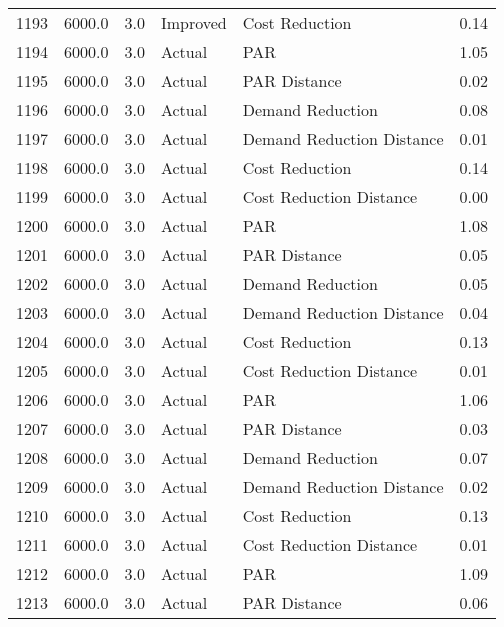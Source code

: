 \begin{longtable}{lrrllr}
1193 &       6000.0 &     3.0 &       Improved &             Cost Reduction &   0.14 \\
1194 &       6000.0 &     3.0 &         Actual &                        PAR &   1.05 \\
1195 &       6000.0 &     3.0 &         Actual &               PAR Distance &   0.02 \\
1196 &       6000.0 &     3.0 &         Actual &           Demand Reduction &   0.08 \\
1197 &       6000.0 &     3.0 &         Actual &  Demand Reduction Distance &   0.01 \\
1198 &       6000.0 &     3.0 &         Actual &             Cost Reduction &   0.14 \\
1199 &       6000.0 &     3.0 &         Actual &    Cost Reduction Distance &   0.00 \\
1200 &       6000.0 &     3.0 &         Actual &                        PAR &   1.08 \\
1201 &       6000.0 &     3.0 &         Actual &               PAR Distance &   0.05 \\
1202 &       6000.0 &     3.0 &         Actual &           Demand Reduction &   0.05 \\
1203 &       6000.0 &     3.0 &         Actual &  Demand Reduction Distance &   0.04 \\
1204 &       6000.0 &     3.0 &         Actual &             Cost Reduction &   0.13 \\
1205 &       6000.0 &     3.0 &         Actual &    Cost Reduction Distance &   0.01 \\
1206 &       6000.0 &     3.0 &         Actual &                        PAR &   1.06 \\
1207 &       6000.0 &     3.0 &         Actual &               PAR Distance &   0.03 \\
1208 &       6000.0 &     3.0 &         Actual &           Demand Reduction &   0.07 \\
1209 &       6000.0 &     3.0 &         Actual &  Demand Reduction Distance &   0.02 \\
1210 &       6000.0 &     3.0 &         Actual &             Cost Reduction &   0.13 \\
1211 &       6000.0 &     3.0 &         Actual &    Cost Reduction Distance &   0.01 \\
1212 &       6000.0 &     3.0 &         Actual &                        PAR &   1.09 \\
1213 &       6000.0 &     3.0 &         Actual &               PAR Distance &   0.06 \\

\end{longtable}
